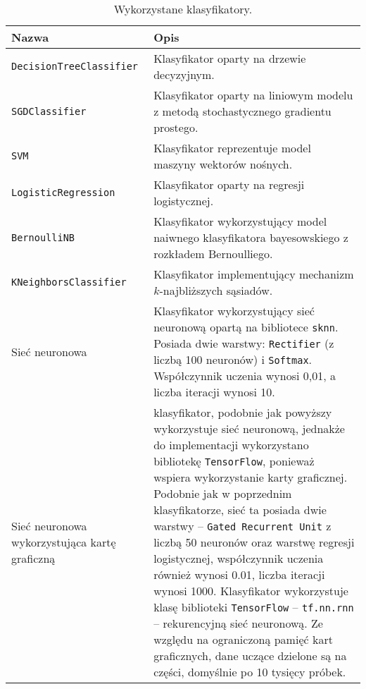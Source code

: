 	\begin{table}[H]
		\centering
		\caption{Wykorzystane klasyfikatory.}
		\begin{tabular}{p{5cm}p{11cm}}
			\toprule
			\textbf{Nazwa} & \textbf{Opis} \\
			\midrule
			\texttt{DecisionTreeClassifier} & Klasyfikator oparty na drzewie decyzyjnym. \\
			\texttt{SGDClassifier} & Klasyfikator oparty na liniowym modelu z metodą stochastycznego gradientu prostego. \\
			\texttt{SVM} & Klasyfikator reprezentuje model maszyny wektorów nośnych. \\
			\texttt{LogisticRegression} & Klasyfikator oparty na regresji logistycznej. \\
			\texttt{BernoulliNB} & Klasyfikator wykorzystujący model naiwnego klasyfikatora bayesowskiego z rozkładem Bernoulliego. \\
			\texttt{KNeighborsClassifier} & Klasyfikator implementujący mechanizm $k$-najbliższych sąsiadów. \\
			Sieć neuronowa & Klasyfikator wykorzystujący sieć neuronową opartą na bibliotece \texttt{sknn}. Posiada dwie warstwy: \texttt{Rectifier} (z liczbą 100 neuronów) i \texttt{Softmax}. Współczynnik uczenia wynosi 0,01, a liczba iteracji wynosi 10. \\
			Sieć neuronowa wykorzystująca kartę graficzną & klasyfikator, podobnie jak powyższy wykorzystuje sieć neuronową, jednakże do implementacji wykorzystano bibliotekę \texttt{TensorFlow}, ponieważ wspiera wykorzystanie karty graficznej. Podobnie jak w poprzednim klasyfikatorze, sieć ta posiada dwie warstwy -- \texttt{Gated Recurrent Unit} z liczbą 50 neuronów oraz warstwę regresji logistycznej, współczynnik uczenia również wynosi 0.01, liczba iteracji wynosi 1000. Klasyfikator wykorzystuje klasę biblioteki \texttt{TensorFlow} -- \texttt{tf.nn.rnn} -- rekurencyjną sieć neuronową. Ze względu na ograniczoną pamięć kart graficznych, dane uczące dzielone są na części, domyślnie po 10 tysięcy próbek. \\
			\bottomrule
		\end{tabular}
	\end{table}

